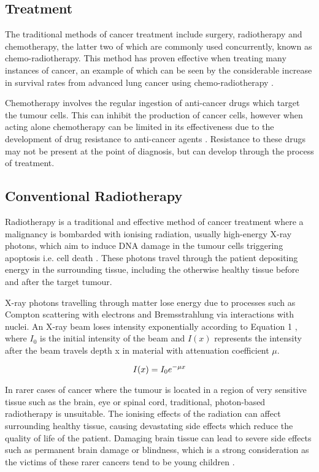 \documentclass[a4paper, 12pt, conference]
{ieeeconf}      %
\begin{document}
\subsection{Treatment}

The traditional methods of cancer treatment include surgery, radiotherapy and chemotherapy, the latter two of which are commonly used concurrently, known as chemo-radiotherapy. This method has proven effective when treating many instances of cancer, an example of which can be seen by the considerable increase in survival rates from advanced lung cancer using chemo-radiotherapy \cite{chemoradiotherapy}.

Chemotherapy involves the regular ingestion of anti-cancer drugs which target the tumour cells. This can inhibit the production of cancer cells, however when acting alone chemotherapy can be limited in its effectiveness due to the development of drug resistance to anti-cancer agents \cite{chemotherapy}. Resistance to these drugs may not be present at the point of diagnosis, but can develop through the process of treatment.

\subsection{Conventional Radiotherapy}

Radiotherapy is a traditional and effective method of cancer treatment where a malignancy is bombarded with ionising radiation, usually high-energy X-ray photons, which aim to induce DNA damage in the tumour cells triggering apoptosis i.e. cell death \cite{apoptosis}. These photons travel through the patient depositing energy in the surrounding tissue, including the otherwise healthy tissue before and after the target tumour. 

X-ray photons travelling through matter lose energy due to processes such as Compton scattering with electrons and Bremsstrahlung via interactions with nuclei. An X-ray beam loses intensity exponentially according to Equation 1 \cite{photon}, where $I_0$ is the initial intensity of the beam and $I(x)$ represents the intensity after the beam travels depth x in material with attenuation coefficient $\mu$.

\begin{equation}
\begin{centering}
I(x) = I_0 e^{-\mu x}
\end{centering}
\end{equation}


In rarer cases of cancer where the tumour is located in a region of very sensitive tissue such as the brain, eye or spinal cord, traditional, photon-based radiotherapy is unsuitable. The ionising effects of the radiation can affect surrounding healthy tissue, causing devastating side effects which reduce the quality of life of the patient. Damaging brain tissue can lead to severe side effects such as permanent brain damage or blindness, which is a strong consideration as the victims of these rarer cancers tend to be young children \cite{children}.
\end{document}
